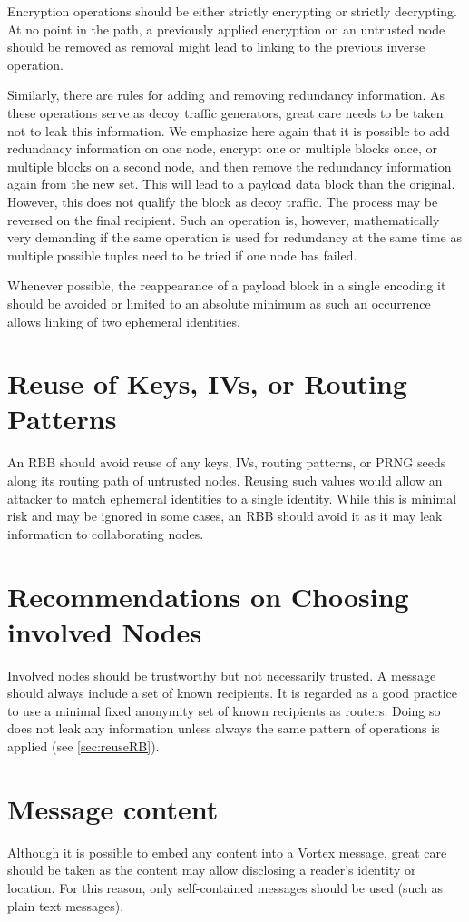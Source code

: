 Encryption operations should be either strictly encrypting or strictly decrypting. At no point in the path, a previously applied encryption on an untrusted node should be removed as removal might lead to linking to the previous inverse operation.

Similarly, there are rules for adding and removing redundancy information. As these operations serve as decoy traffic generators, great care needs to be taken not to leak this information. We emphasize here again that it is possible to add redundancy information on one node, encrypt one or multiple blocks once, or multiple blocks on a second node, and then remove the redundancy information again from the new set. This will lead to a payload data block than the original. However, this does not qualify the block as decoy traffic. The process may be reversed on the final recipient. Such an operation is, however, mathematically very demanding if the same operation is used for redundancy at the same time as multiple possible tuples need to be tried if one node has failed.

Whenever possible, the reappearance of a payload block in a single encoding it should be avoided or limited to an absolute minimum as such an occurrence allows linking of two ephemeral identities.

\section{Reuse of Keys, IVs, or Routing Patterns}
An RBB should avoid reuse of any keys, IVs, routing patterns, or PRNG seeds along its routing path of untrusted nodes. Reusing such values would allow an attacker to match ephemeral identities to a single identity. While this is minimal risk and may be ignored in some cases, an RBB should avoid it as it may leak information to collaborating nodes.

\section{Recommendations on Choosing involved Nodes}
Involved nodes should be trustworthy but not necessarily trusted. A message should always include a set of known recipients. It is regarded as a good practice to use a minimal fixed anonymity set of known recipients as routers. Doing so does not leak any information unless always the same pattern of operations is applied (see \ref{sec:reuseRB}).

\section{Message content}
Although it is possible to embed any content into a Vortex message, great care should be taken as the content may allow disclosing a reader's identity or location. For this reason, only self-contained messages should be used (such as plain text messages).

